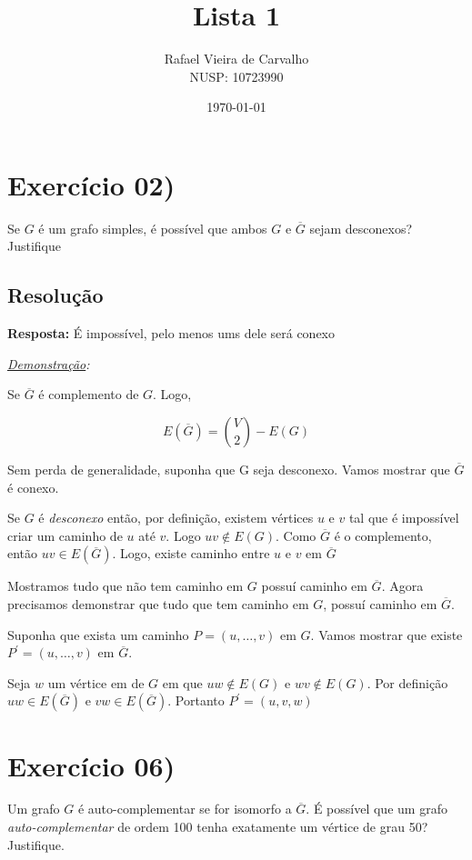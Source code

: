 \documentclass[12pt, a4paper]{article}
\title{Lista 1}
\author{Rafael Vieira de Carvalho \\ NUSP: 10723990}
\date{\today}
\begin{document}
\maketitle

\section*{Exercício 02)}
Se $G$ é um grafo simples, é possível que ambos $G$ e $\overline{G}$ sejam desconexos?
Justifique

\subsection*{Resolução}

\textbf{Resposta:} É impossível, pelo menos ums dele será conexo

\smallskip

\textit{\underline{Demonstração}:}

\bigskip

Se $\overline{G}$ é complemento de $G$. Logo,

$$E(\overline{G}) = \binom{V}{2} - E(G)$$

Sem perda de generalidade, suponha que G seja desconexo. Vamos mostrar 
que $\overline{G}$ é conexo.

Se $G$ é \textit{desconexo} então, por definição, existem vértices
$u$ e $v$ tal que é impossível criar um caminho de $u$ até $v$.
Logo $uv \notin E(G)$. Como $\overline{G}$ é o complemento, então 
$uv \in E(\overline{G})$. Logo, existe caminho entre $u$ e $v$ em 
$\overline{G}$

Mostramos tudo que não tem caminho em $G$ possuí caminho em $\overline{G}$.
Agora precisamos demonstrar que tudo que tem caminho em $G$, possuí caminho
em $\overline{G}$.

Suponha que exista um caminho $P = (u, \hdots , v)$ em $G$. Vamos mostrar
que existe $P^{'} = (u, \hdots , v)$ em $\overline{G}$.

Seja $w$ um vértice em de $G$ em que $uw \notin E(G)$ e $wv \notin E(G)$.
Por definição $uw \in E(\overline{G})$ e $vw \in E(\overline{G})$. Portanto
$P^{'} = (u, v, w)$ 



\newpage


\section*{Exercício 06)}

Um grafo $G$ é auto-complementar se for isomorfo a $\overline{G}$. É possível que um grafo 
\textit{auto-complementar} de ordem 100 tenha exatamente um vértice de grau 50? Justifique.
\end{document}
